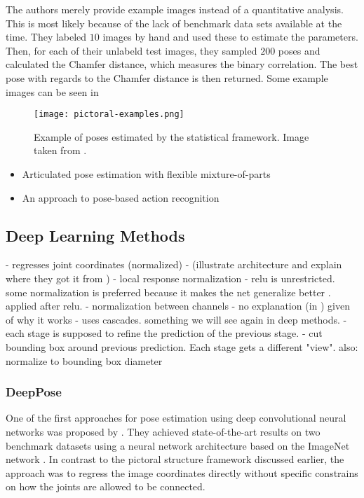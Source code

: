 The authors merely provide example images instead of a quantitative analysis.
This is most likely because of the lack of benchmark data sets available at the time.
They labeled $10$ images by hand and used these to estimate the parameters.
Then, for each of their unlabeld test images, they sampled $200$ poses and calculated the Chamfer distance, which measures the binary correlation.
The best pose with regards to the Chamfer distance is then returned.
Some example images can be seen in 

\begin{figure}[htb!]
    \centering
    \texttt{[image: pictoral-examples.png]}
    \caption{Example of poses estimated by the statistical framework. Image taken from \cite{felzenszwalb_pictorial_2005}.}
    \label{fig:pictoral-examples}
\end{figure}

\begin{itemize}
    \item Articulated pose estimation with flexible mixture-of-parts \cite{yang_articulated_2011}
    \item An approach to pose-based action recognition \cite{wang_approach_2013}
\end{itemize}

\subsection{Deep Learning Methods}

- regresses joint coordinates (normalized)
- (illustrate architecture and explain where they got it from \cite{krizhevsky_imagenet_2012})
- local response normalization  
    - relu is unrestricted. some normalization is preferred because it makes the net generalize better \cite{krizhevsky_imagenet_2012}. applied after relu.
    - normalization between channels
    - no explanation (in \cite{krizhevsky_imagenet_2012}) given of why it works
- uses cascades. something we will see again in deep methods.
    - each stage is supposed to refine the prediction of the previous stage.
    - cut bounding box around previous prediction. Each stage gets a different "view". also: normalize to bounding box diameter

\subsubsection{DeepPose}
One of the first approaches for pose estimation using deep convolutional neural networks was proposed by \cite{toshev_deeppose:_2014}.
They achieved state-of-the-art results on two benchmark datasets using a neural network architecture based on the ImageNet network \cite{krizhevsky_imagenet_2012}.
In contrast to the pictoral structure framework discussed earlier, the approach was to regress the image coordinates directly without specific constrains on how the joints are allowed to be connected.

